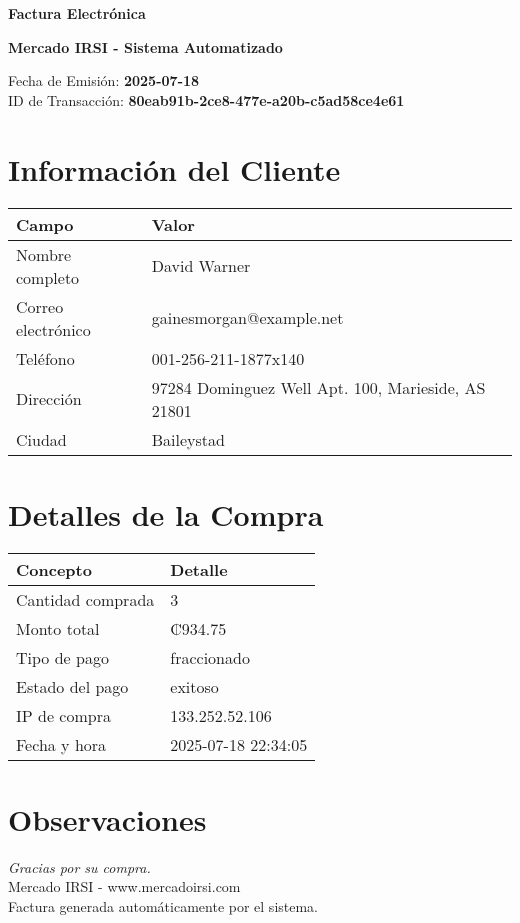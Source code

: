 \documentclass[12pt]{article}
\begin{document}
\begin{center}
    \Huge \textbf{Factura Electrónica}

    \vspace{0.3cm}
    \large \textbf{Mercado IRSI - Sistema Automatizado}

    \vspace{0.5cm}
    \normalsize Fecha de Emisión: \textbf{2025-07-18} \\
    ID de Transacción: \textbf{80eab91b-2ce8-477e-a20b-c5ad58ce4e61} \\
\end{center}

\vspace{1cm}

\section*{Información del Cliente}
\begin{tabularx}{\textwidth}{L{4cm} L{12cm}}
\textbf{Campo} & \textbf{Valor} \\
\hline
Nombre completo & David Warner \\
Correo electrónico & gainesmorgan@example.net \\
Teléfono & 001-256-211-1877x140 \\
Dirección & 97284 Dominguez Well Apt. 100, Marieside, AS 21801 \\
Ciudad & Baileystad \\
\end{tabularx}

\vspace{0.8cm}

\section*{Detalles de la Compra}
\begin{tabularx}{\textwidth}{L{6cm} L{10cm}}
\textbf{Concepto} & \textbf{Detalle} \\
\hline
Cantidad comprada & 3 \\
Monto total & ₡934.75 \\
Tipo de pago & fraccionado \\
Estado del pago & exitoso \\
IP de compra & 133.252.52.106 \\
Fecha y hora & 2025-07-18 22:34:05 \\
\end{tabularx}

\vspace{1.5cm}

\section*{Observaciones}


\vfill

\begin{center}
    \textit{Gracias por su compra.} \\
    Mercado IRSI - www.mercadoirsi.com \\
    Factura generada automáticamente por el sistema.
\end{center}
\end{document}
